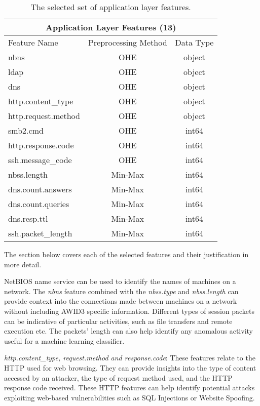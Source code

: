 \begin{table}[H]
\centering
\begin{tabular}{lcc}
\hline
\multicolumn{3}{c}{\textbf{Application Layer Features (13)}} \\ \hline
Feature Name & Preprocessing Method & Data Type \\ \hline
nbns & OHE & object \\
ldap & OHE & object \\
dns & OHE & object \\
http.content\_type & OHE & object \\
http.request.method & OHE & object \\
smb2.cmd & OHE & int64 \\
http.response.code & OHE & int64 \\
ssh.message\_code & OHE & int64 \\
nbss.length & Min-Max & int64 \\
dns.count.answers & Min-Max & int64 \\
dns.count.queries & Min-Max & int64 \\
dns.resp.ttl & Min-Max & int64 \\
ssh.packet\_length & Min-Max & int64 \\ \hline
\end{tabular}
\caption{The selected set of application layer features.}
\label{tab:application_features}
\end{table}

The section below covers each of the selected features and their justification in more detail.

NetBIOS name service can be used to identify the names of machines on a network. The \textit{nbns} feature combined with the \textit{nbss.type} and \textit{nbss.length} can provide context into the connections made between machines on a network without including AWID3 specific information. Different types of session packets can be indicative of particular activities, such as file transfers and remote execution etc. The packets' length can also help identify any anomalous activity useful for a machine learning classifier. 

\medskip
\textit{http.content\_type, request.method and response.code}: These features relate to the HTTP used for web browsing. They can provide insights into the type of content accessed by an attacker, the type of request method used, and the HTTP response code received. These HTTP features can help identify potential attacks exploiting web-based vulnerabilities such as SQL Injections or Website Spoofing.

